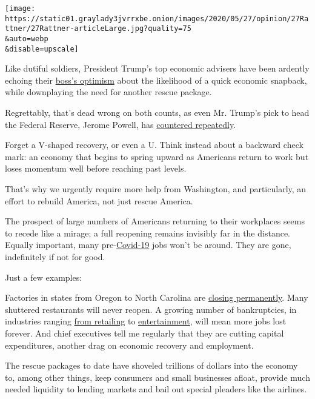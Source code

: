 \texttt{[image: https://static01.graylady3jvrrxbe.onion/images/2020/05/27/opinion/27Rattner/27Rattner-articleLarge.jpg?quality=75\\\&auto=webp\\\&disable=upscale]}

Like dutiful soldiers, President Trump's top economic advisers have been
ardently echoing their
\href{https://www.nytimes3xbfgragh.onion/aponline/2020/05/24/business/bc-us-election-2020-trump-2021-comeback.html}{boss's
optimism} about the likelihood of a quick economic snapback, while
downplaying the need for another rescue package.

Regrettably, that's dead wrong on both counts, as even Mr. Trump's pick
to head the Federal Reserve, Jerome Powell, has
\href{https://www.nytimes3xbfgragh.onion/2020/05/19/us/politics/mnuchin-powell-senate-hearing.html}{countered
repeatedly}.

Forget a V-shaped recovery, or even a U. Think instead about a backward
check mark: an economy that begins to spring upward as Americans return
to work but loses momentum well before reaching past levels.

That's why we urgently require more help from Washington, and
particularly, an effort to rebuild America, not just rescue America.

The prospect of large numbers of Americans returning to their workplaces
seems to recede like a mirage; a full reopening remains invisibly far in
the distance. Equally important, many
pre-\href{https://www.nytimes3xbfgragh.onion/2020/05/28/business/economy/coronavirus-stimulus-unemployment.html}{Covid-19}
jobs won't be around. They are gone, indefinitely if not for good.

Just a few examples:

Factories in states from Oregon to North Carolina are
\href{https://www.wsj.com/articles/factories-close-for-good-as-coronavirus-cuts-demand-11589122800}{closing
permanently}. Many shuttered restaurants will never reopen. A growing
number of bankruptcies, in industries ranging
\href{https://www.nytimes3xbfgragh.onion/2020/04/21/business/coronavirus-department-stores-neiman-marcus.html?searchResultPosition=3}{from
retailing} to
\href{https://www.wsj.com/articles/owner-of-cmx-cinemas-files-for-bankruptcy-protection-11587942170}{entertainment},
will mean more jobs lost forever. And chief executives tell me regularly
that they are cutting capital expenditures, another drag on economic
recovery and employment.

The rescue packages to date have shoveled trillions of dollars into the
economy to, among other things, keep consumers and small businesses
afloat, provide much needed liquidity to lending markets and bail out
special pleaders like the airlines.

